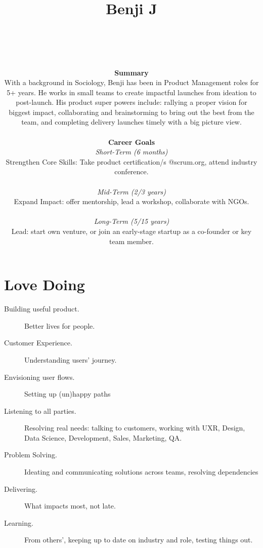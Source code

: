 \documentclass[10pt, a4paper, twocolumn]{article}
\title{Benji J} %
\author{
	\authorstyle{Product Manager %
	[SaaS,
	Music,
	Crypto---%
	Blockchain---%
	Web3%
	]
	} \\ \\
	\noindent\fbox{%
    \parbox{\textwidth}{%
\textbf{This Document Goal}
is to better understand:
1) what I have to offer, how the market sees me;
2) opportunities I haven’t considered; and
3) connect with people you think I should talk with. \\ \\
\textbf{Candidate-Market Fit} \\ \textit{%
Seeking a remote \textbf{Product Manager} role with attention to UX at early stage (Series A, Pre-IPO/ICO) \textbf{Crypto} B2C company with emphasis one these areas:
social impact,
real life assets,
music and media industries. \\
\#crypto
\#IP-rights
\#real-world-assets
\#music
\#streaming
\#NFTs
\#AI
\#B2C
\#B2B2C
}
    }%
}
\\ \\
%
\textbf{Summary} \\
With a background in Sociology, Benji has been in Product Management roles for 5+ years.
He works in small teams to create impactful launches from ideation to post-launch.
His product super powers include:
rallying a proper vision for biggest impact,
collaborating and brainstorming to bring out the best from the team,
and completing delivery launches timely with a big picture view.
\\ \\
\textbf{Career Goals} \\ %
\textit{Short-Term (6 months)} \\
Strengthen Core Skills:
Take product certification/s @scrum.org, attend industry conference.
\\ \\ %
  \textit{Mid-Term (2/3 years)} \\
Expand Impact: offer mentorship, lead a workshop, collaborate with NGOs.
\\ \\ %
\textit{Long-Term (5/15 years)} \\
Lead:
start own venture, or join an early-stage startup as a co-founder or key team member.
%
}
\date{ }
\begin{document}
% 
%
\maketitle %
\thispagestyle{firstpage} %
%
%
%
\section*{Love Doing}

\begin{description}
\item[Building useful product.] Better lives for people. %
\item[Customer Experience.]
Understanding users' journey.
\item[Envisioning user flows.] Setting up (un)happy paths
\item[Listening to all parties.] Resolving real needs: %
talking to customers,
working with UXR,
Design,
Data Science,
Development,
Sales,
Marketing,
QA.
\item[Problem Solving.]%
Ideating and communicating solutions across teams, resolving dependencies
\item[Delivering.] What impacts most, not late.
\item[Learning.]
From others', %
keeping up to date on industry and role, testing things out.
\end{description}
\end{document}
